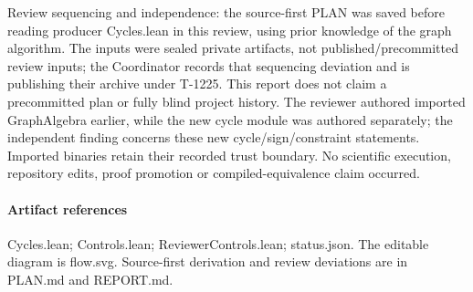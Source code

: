 \documentclass[11pt]{article}
\begin{document}
Review sequencing and independence: the source-first PLAN was saved before reading producer Cycles.lean in this review, using prior knowledge of the graph algorithm. The inputs were sealed private artifacts, not published/precommitted review inputs; the Coordinator records that sequencing deviation and is publishing their archive under T-1225. This report does not claim a precommitted plan or fully blind project history. The reviewer authored imported GraphAlgebra earlier, while the new cycle module was authored separately; the independent finding concerns these new cycle/sign/constraint statements. Imported binaries retain their recorded trust boundary. No scientific execution, repository edits, proof promotion or compiled-equivalence claim occurred.\par\medskip
\paragraph{Artifact references} Cycles.lean; Controls.lean; ReviewerControls.lean; status.json. The editable diagram is flow.svg. Source-first derivation and review deviations are in PLAN.md and REPORT.md.
\end{document}
